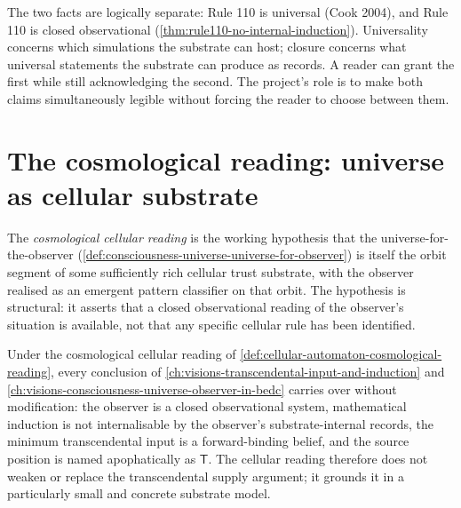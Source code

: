 \begin{principle}
\label{prin:cellular-automaton-universality-vs-closure}
The two facts are logically separate: Rule 110 is universal (Cook 2004), and Rule 110 is closed observational (\autoref{thm:rule110-no-internal-induction}). Universality concerns which simulations the substrate can host; closure concerns what universal statements the substrate can produce as records. A reader can grant the first while still acknowledging the second. The project's role is to make both claims simultaneously legible without forcing the reader to choose between them.
\end{principle}

\section{The cosmological reading: universe as cellular substrate}
\label{sec:cellular-automaton-reading-cosmological}

\begin{definition}
\label{def:cellular-automaton-cosmological-reading}
The \emph{cosmological cellular reading} is the working hypothesis that the universe-for-the-observer (\autoref{def:consciousness-universe-universe-for-observer}) is itself the orbit segment of some sufficiently rich cellular trust substrate, with the observer realised as an emergent pattern classifier on that orbit. The hypothesis is structural: it asserts that a closed observational reading of the observer's situation is available, not that any specific cellular rule has been identified.
\end{definition}

\begin{principle}
\label{prin:cellular-automaton-cosmological-preserves-earlier}
Under the cosmological cellular reading of \autoref{def:cellular-automaton-cosmological-reading}, every conclusion of \autoref{ch:visions-transcendental-input-and-induction} and \autoref{ch:visions-consciousness-universe-observer-in-bedc} carries over without modification: the observer is a closed observational system, mathematical induction is not internalisable by the observer's substrate-internal records, the minimum transcendental input is a forward-binding belief, and the source position is named apophatically as \(\mathsf{T}\). The cellular reading therefore does not weaken or replace the transcendental supply argument; it grounds it in a particularly small and concrete substrate model.
\end{principle}

